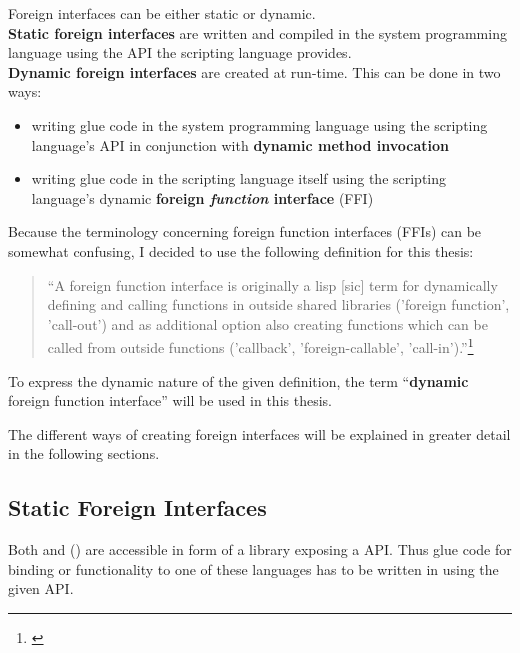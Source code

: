 Foreign interfaces can be either static or dynamic.\\
\textbf{Static foreign interfaces} are written and compiled in the system programming language using the API the scripting language provides.\\
\textbf{Dynamic foreign interfaces} are created at run-time. This can be done in two ways:
\begin{itemize}
\item writing glue code in the system programming language using the scripting language's API in conjunction with \textbf{dynamic method invocation}
\item writing glue code in the scripting language itself using the scripting language's dynamic \textbf{foreign \textit{function} interface} (FFI)
\end{itemize}

Because the terminology concerning foreign function interfaces (FFIs) can be somewhat confusing, I decided to use the following definition for this thesis:

\begin{quotation}
``A foreign function interface is originally a lisp [sic] term for dynamically defining and calling functions in outside shared libraries ('foreign function', 'call-out') and as additional option also creating functions which can be called from outside functions ('callback', 'foreign-callable', 'call-in').''\footnote{\citep{DesignFFI}}
\end{quotation}

To express the dynamic nature of the given definition, the term ``\textbf{dynamic} foreign function interface'' will be used in this thesis.

The different ways of creating foreign interfaces will be explained in greater detail in the following sections.

\subsection{Static Foreign Interfaces}

Both  and  () are accessible in form of a library exposing a  API. Thus glue code for binding  or  functionality to one of these languages has to be written in  using the given API.

